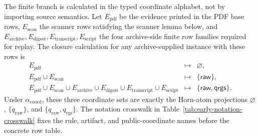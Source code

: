 \documentclass[runningheads]{llncs}
\newcommand{\rawBeginTokenCoord}{q_{\mathrm{raw}}}
\newcommand{\qlex}{\rawBeginTokenCoord}
\newcommand{\qrgs}{q_{\mathrm{rgs}}}
\newcommand{\coordAtom}{\alpha_{\mathrm{coord}}}
\begin{document}
The finite branch is calculated in the typed coordinate alphabet, not
by importing source semantics.  Let \(E_{\mathrm{pdf}}\) be the evidence printed
in the PDF base rows, \(E_{\mathrm{scan}}\) the scanner rows satisfying the
scanner lemma below, and \(E_{\mathrm{archive}},E_{\mathrm{digest}},
E_{\mathrm{transcript}},E_{\mathrm{script}}\) the four archive-side finite row
families required for replay.  The closure calculation for any archive-supplied
instance with these rows is
\[
\begin{array}{rcl}
E_{\mathrm{pdf}}&\mapsto&\varnothing,\\
E_{\mathrm{pdf}}\cup E_{\mathrm{scan}}&\mapsto&\{\mathsf{raw}\},\\
E_{\mathrm{pdf}}\cup E_{\mathrm{scan}}\cup E_{\mathrm{archive}}\cup
E_{\mathrm{digest}}\cup E_{\mathrm{transcript}}\cup E_{\mathrm{script}}
&\mapsto&\{\mathsf{raw},\mathsf{qrgs}\}.
\end{array}
\]
Under \(\coordAtom\), these three coordinate sets are exactly the Horn-atom
projections \(\varnothing\), \(\{\qlex\}\), and \(\{\qlex,\qrgs\}\).
The notation crosswalk in Table~\ref{tab:early-notation-crosswalk} fixes the
rule, artifact, and public-coordinate names before the concrete row table.
\end{document}
